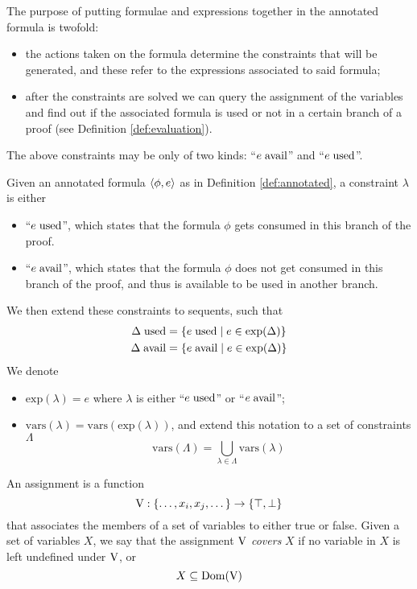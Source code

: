 The purpose of putting formulae and expressions together in the annotated formula is twofold:
\begin{itemize}
	\item the actions taken on the formula determine the constraints that will be generated, and these refer to the expressions associated to said formula;
	\item after the constraints are solved we can query the assignment of the variables and find out if the associated formula is used or not in a certain branch of a proof (see Definition \ref{def:evaluation}).
\end{itemize}
The above constraints may be only of two kinds: ``$e \; \mathrm{avail}$'' and ``$e \; \mathrm{used}$''.
\begin{define}[Constraints]
	\label{def:constraints}
	Given an annotated formula $\langle \phi, e \rangle$ as in Definition \ref{def:annotated}, a constraint $\lambda$ is either
	\begin{itemize}
		\item ``$e \; \mathrm{used}$'', which states that the formula $\phi$ gets consumed in this branch of the proof.
		\item ``$e \; \mathrm{avail}$'', which states that the formula $\phi$ does not get consumed in this branch of the proof, and thus is available to be used in another branch.
	\end{itemize}
	We then extend these constraints to sequents, such that
	\begin{align*}
		\Delta \; \mathrm{used} &= \{ e \; \mathrm{used} \mid e \in \mathrm{exp}(\Delta) \} \\
		\Delta \; \mathrm{avail} &= \{ e \; \mathrm{avail} \mid e \in \mathrm{exp}(\Delta) \}
	\end{align*}
	We denote
	\begin{itemize}
		\item $\mathrm{exp}(\lambda) = e$ where $\lambda$ is either ``$e \; \mathrm{used}$'' or ``$e \; \mathrm{avail}$'';
		\item $\mathrm{vars}(\lambda) = \mathrm{vars}(\mathrm{exp}(\lambda))$, and extend this notation to a set of constraints $\Lambda$
			$$ \mathrm{vars}(\Lambda) = \bigcup_{\lambda \in \Lambda} \mathrm{vars}(\lambda) $$
	\end{itemize}
\end{define}
\begin{define}[Assignment]
	\label{def:assignment}
	An assignment is a function
	$$ \mathrm{V} : \{ \dots, x_i, x_j, \dots \} \rightarrow \{ \top, \bot \} $$
	that associates the members of a set of variables to either true or false.
	Given a set of variables $X$, we say that the assignment $\mathrm{V}$ \textit{covers} $X$ if no variable in $X$ is left undefined under $\mathrm{V}$, or
	$$ X \subseteq \mathrm{Dom}(\mathrm{V}) $$
\end{define}
